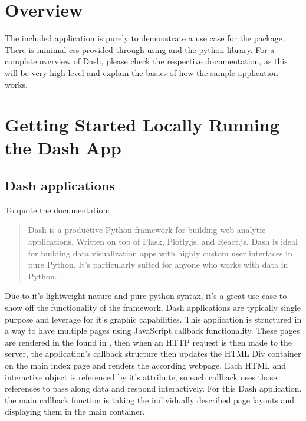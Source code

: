 \documentclass[letterpaper,10pt,english]{sphinxmanual}
\begin{document}
\section{Overview}
\label{\detokenize{dashapp_documentation:overview}}
\sphinxAtStartPar
The included  application is purely
to demonstrate a use case for the  package. There is
minimal css provided through using
and the 
python library. For a complete overview of Dash, please check the
respective documentation, as this will be very high level and explain
the basics of how the sample application works.


\section{Getting Started \sphinxhyphen{} Locally Running the Dash App}
\label{\detokenize{dashapp_documentation:getting-started-locally-running-the-dash-app}}

\subsection{Dash applications}
\label{\detokenize{dashapp_documentation:dash-applications}}
\sphinxAtStartPar
To quote the 
documentation:
\begin{quote}

\sphinxAtStartPar
Dash is a productive Python framework for building web analytic
applications. Written on top of Flask, Plotly.js, and React.js, Dash
is ideal for building data visualization apps with highly custom user
interfaces in pure Python. It’s particularly suited for anyone who
works with data in Python.
\end{quote}

\sphinxAtStartPar
Due to it’s lightweight nature and pure python syntax, it’s a great use
case to show off the functionality of the  framework. Dash
applications are typically single purpose and leverage  for
it’s graphic capabilities. This application is structured in a way to
have multiple pages using JavaScript callback functionality. These pages
are rendered in the  found in , then when an
HTTP request is then made to the  server, the application’s
callback structure then updates the HTML Div container on the main index
page and renders the according webpage. Each HTML and interactive object
is referenced by it’s  attribute, so each callback uses those
references to pass along data and respond interactively. For this Dash
application, the main callback function is taking the individually
described page layouts and displaying them in the main 
container.
\end{document}
